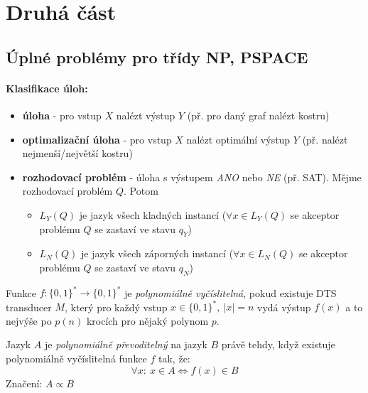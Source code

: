 \documentclass[a4paper]{article}      %
\newenvironment{definition}[1][Definice]{\begin{trivlist}
\item[\hskip \labelsep {\bfseries #1}]}{\end{trivlist}}
\begin{document}
\section{Druhá část}

\subsection{Úplné problémy pro třídy NP, PSPACE}

\paragraph{Klasifikace úloh:}
\begin{itemize}
\item \textbf{úloha} - pro vstup $X$ nalézt výstup $Y$ (př. pro daný graf nalézt kostru)
\item \textbf{optimalizační úloha} - pro vstup $X$ nalézt optimální výstup $Y$ (př. nalézt nejmenší/největší kostru)
\item \textbf{rozhodovací problém} - úloha s výstupem \emph{ANO} nebo \emph{NE} (př. SAT). Mějme rozhodovací problém $Q$. Potom
	\begin{itemize}
	\item $L_{Y}(Q)$ je jazyk všech kladných instancí ($\forall x \in L_{Y}(Q)$ se akceptor problému $Q$ se zastaví ve stavu $q_{Y}$)
	\item $L_{N}(Q)$ je jazyk všech záporných instancí ($\forall x \in L_{N}(Q)$ se akceptor problému $Q$ se zastaví ve stavu $q_{N}$)
	\end{itemize}
\end{itemize}

\begin{definition}[Polynomiálně vyčíslitelná funkce]
Funkce $f: \lbrace 0,1 \rbrace^{*} \rightarrow \lbrace 0,1 \rbrace^{*}$ je \emph{polynomiálně vyčíslitelná}, pokud existuje DTS transducer $M$,
který pro každý vstup $x \in \lbrace 0,1 \rbrace^{*},\ |x|=n$ vydá výstup $f(x)$ a to nejvýše po $p(n)$ krocích pro nějaký polynom $p$. 
\end{definition}

\begin{definition}[Polynomiální převoditelnost]
Jazyk $A$ je \emph{polynomiálně převoditelný} na jazyk $B$ právě tehdy, když
existuje polynomiálně vyčíslitelná funkce $f$ tak, že:
\[
\forall x:\ x \in A \Leftrightarrow f(x) \in B
\]
Značení: $A \varpropto B$\\
\end{definition}
\end{document}
